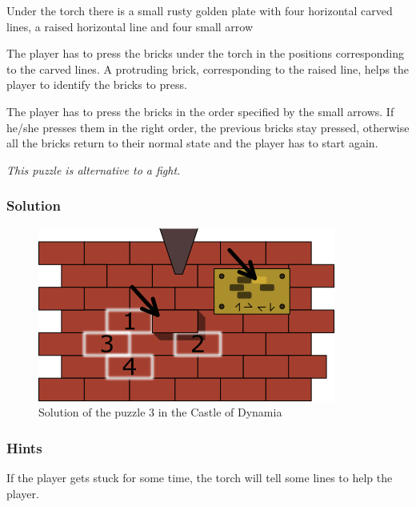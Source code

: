 

Under the torch there is a small rusty golden plate with four horizontal carved lines, a raised horizontal line and four small arrow

The player has to press the bricks under the torch in the positions corresponding to the carved lines. A protruding brick, corresponding to the raised line, helps the player to identify the bricks to press.

The player has to press the bricks in the order specified by the small arrows. If he/she presses them in the right order, the previous bricks stay pressed, otherwise all the bricks return to their normal state and the player has to start again.

\textit{This puzzle is alternative to a fight.}

\subsubsection*{Solution}
\begin{figure}[H]
  \centering
  \includegraphics[width=\textwidth]{Images/Puzzles/castleOfDynamia3Solution}
  \caption{Solution of the puzzle 3 in the Castle of Dynamia}
\end{figure}

\subsubsection*{Hints}
If the player gets stuck for some time, the torch will tell some lines to help the player.

